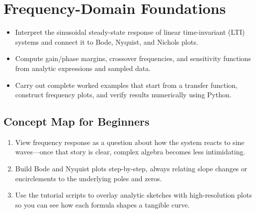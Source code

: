 \chapter{Frequency-Domain Foundations}
\label{chap:frequency}

\begin{learningobjective}
\begin{itemize}[leftmargin=*]
    \item Interpret the sinusoidal steady-state response of linear time-invariant (LTI) systems and connect it to Bode, Nyquist, and Nichols plots.
    \item Compute gain/phase margins, crossover frequencies, and sensitivity functions from analytic expressions and sampled data.
    \item Carry out complete worked examples that start from a transfer function, construct frequency plots, and verify results numerically using Python.
\end{itemize}
\end{learningobjective}

\section{Concept Map for Beginners}
\begin{conceptroadmap}
\begin{enumerate}[leftmargin=*]
    \item View frequency response as a question about how the system reacts to sine waves—once that story is clear, complex algebra becomes less intimidating.
    \item Build Bode and Nyquist plots step-by-step, always relating slope changes or encirclements to the underlying poles and zeros.
    \item Use the tutorial scripts to overlay analytic sketches with high-resolution plots so you can see how each formula shapes a tangible curve.
\end{enumerate}
\end{conceptroadmap}

